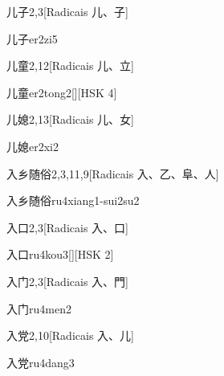 \begin{entry}{儿子}{2,3}[Radicais ⼉、⼦]
  \begin{phonetics}{儿子}{er2zi5}
  \end{phonetics}
\end{entry}

\begin{entry}{儿童}{2,12}[Radicais ⼉、⽴]
  \begin{phonetics}{儿童}{er2tong2}[][HSK 4]
  \end{phonetics}
\end{entry}

\begin{entry}{儿媳}{2,13}[Radicais ⼉、⼥]
  \begin{phonetics}{儿媳}{er2xi2}
  \end{phonetics}
\end{entry}

\begin{entry}{入乡随俗}{2,3,11,9}[Radicais ⼊、⼄、⾩、⼈]
  \begin{phonetics}{入乡随俗}{ru4xiang1-sui2su2}
  \end{phonetics}
\end{entry}

\begin{entry}{入口}{2,3}[Radicais ⼊、⼝]
  \begin{phonetics}{入口}{ru4kou3}[][HSK 2]
  \end{phonetics}
\end{entry}

\begin{entry}{入门}{2,3}[Radicais ⼊、⾨]
  \begin{phonetics}{入门}{ru4men2}
  \end{phonetics}
\end{entry}

\begin{entry}{入党}{2,10}[Radicais ⼊、⼉]
  \begin{phonetics}{入党}{ru4dang3}
  \end{phonetics}
\end{entry}


